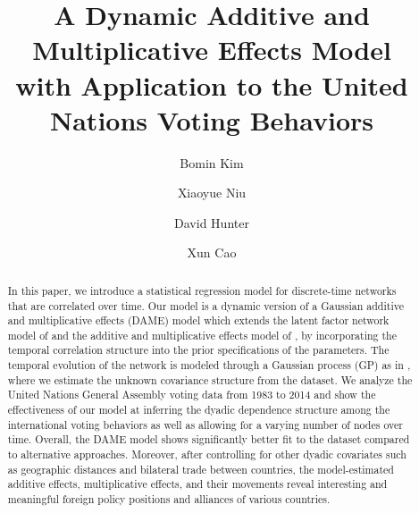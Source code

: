 \documentclass[a4paper]{article}
\title{A Dynamic Additive and Multiplicative Effects Model\\
	with Application to the United Nations Voting Behaviors}
\author[1]{Bomin Kim}
\author[1]{Xiaoyue Niu}
\author[1]{David Hunter}
\author[2]{Xun Cao}
\affil[1]{Department of Statistics, The Pennsylvania State University}
\affil[2]{Department of Political Science, The Pennsylvania State University}
\date{}
\begin{document}
	\maketitle
	\begin{abstract}
		\noindent  
		In this paper, we introduce a statistical regression model for discrete-time networks that are correlated over time. Our model is a dynamic version of a Gaussian additive and multiplicative effects (DAME) model which extends the latent factor network model of \cite{hoff2009multiplicative} and the additive and multiplicative effects model of \cite{minhas2016inferential}, by incorporating the temporal correlation structure into the prior specifications of the parameters. The temporal evolution of the network is modeled through a Gaussian process (GP) as in \cite{durante2013nonparametric}, where we estimate the unknown covariance structure from the dataset. We analyze the United Nations General Assembly voting data from 1983 to 2014 \citep{12379_2016} and show the effectiveness of our model at inferring the dyadic dependence structure among the international voting behaviors as well as allowing for a varying number of nodes over time. Overall, the DAME model shows significantly better fit to the dataset compared to alternative approaches. Moreover, after controlling for other dyadic covariates such as geographic distances and bilateral trade between countries, the model-estimated additive effects, multiplicative effects, and their movements reveal interesting and meaningful foreign policy positions and alliances of various countries. 
	\end{abstract}
\end{document}

